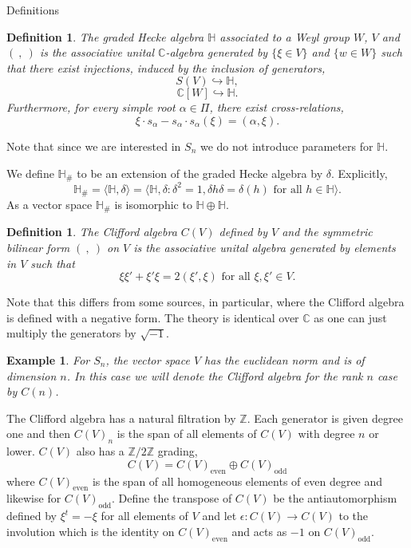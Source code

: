 \documentclass[a4paper,10pt]{amsart}
\newtheorem{definition}[theorem]{Definition}
\newtheorem{example}[theorem]{Example}
\DeclareMathOperator{\odd}{odd}
\DeclareMathOperator{\even}{even}
\begin{document}
\begin{section}{Definitions}
\begin{definition} The graded Hecke algebra $\mathbb{H}$ associated to a Weyl group $W$, $V$ and $( \ ,\ )$ is the associative unital $\mathbb{C}$-algebra generated by $\{ \xi \in V\}$ and $\{w\in W\}$ such that there exist injections, induced by the inclusion of generators,
$$S(V) \hookrightarrow \mathbb{H},$$
$$\mathbb{C}[W] \hookrightarrow \mathbb{H}.$$
Furthermore, for every simple root $\alpha \in \Pi$, there exist cross-relations,
$$\xi \cdot s_\alpha - s_\alpha \cdot s_\alpha(\xi) = ( \alpha , \xi ).$$ 
\end{definition} 
Note that since we are interested in $S_n$ we do not introduce parameters for $\mathbb{H}$.

We define $\mathbb{H}_\#$ to be an extension  of the graded Hecke algebra by $\delta$. Explicitly,
$$ \mathbb{H}_\# = \langle \mathbb{H} , \delta \rangle = \langle \mathbb{H}, \delta : \delta^2 = 1, \delta h \delta = \delta(h) \text{ for all } h \in \mathbb{H} \rangle.  $$  
As a vector space $\mathbb{H}_\#$ is isomorphic to $\mathbb{H} \oplus \mathbb{H}$.



\begin{definition}\label{Clifford} The Clifford algebra  $C(V)$ defined by $V$ and the symmetric bilinear form  $( \ , \ )$ on $V$ is the associative unital algebra generated by elements in $V$ such that
$$\xi\xi' + \xi'\xi = 2( \xi' , \xi )  \text{ for all } \xi, \xi' \in V.$$ 
\end{definition}
Note that this differs from some sources, \cite{BCT12} in particular, where the Clifford algebra is defined with a negative form. The theory is identical over $\mathbb{C}$ as one can just multiply the generators by $\sqrt{-1}$. 

\begin{example} For $S_n$, the vector space $V$ has the euclidean norm and is of dimension $n$. In this case we will denote the Clifford algebra for the rank $n$ case by $C(n)$. \end{example}

The Clifford algebra has a natural filtration by $\mathbb{Z}$. Each generator is given degree one and then $C(V)_n$ is the span of all elements of $C(V)$ with degree $n$ or lower. $C(V)$ also has a $\mathbb{Z}/2\mathbb{Z}$ grading,
$$C(V) = C(V)_{\even}\oplus C(V)_{\odd}$$ 
where $C(V)_{\even}$ is the span of all homogeneous elements of even degree and likewise for $C(V)_{\odd}$.  
Define the transpose of $C(V)$ be the antiautomorphism defined by $\xi^t = -\xi$ for all elements of $V$ and let $\epsilon: C(V) \to C(V)$ to the involution which is the identity on $C(V)_{\even}$ and acts as $-1$ on $C(V)_{\odd}$.


\end{section}
\end{document}
